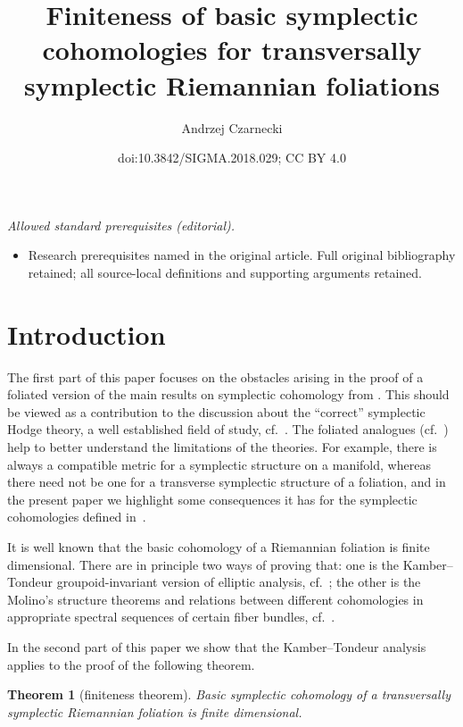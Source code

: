 \documentclass[10pt,a4paper]{amsart}
\title{Finiteness of basic symplectic cohomologies for transversally symplectic Riemannian foliations}
\author{Andrzej Czarnecki}
\date{doi:10.3842/SIGMA.2018.029; CC BY 4.0}
\numberwithin{equation}{section}
\newtheorem{Theorem}{Theorem}[section]
{ \theoremstyle{definition}
\newtheorem{Definition}[Theorem]{Definition}
\newtheorem{Example}[Theorem]{Example}
\newtheorem{Remark}[Theorem]{Remark} }
\begin{document}
\maketitle
\noindent\textit{Allowed standard prerequisites (editorial).}\begin{itemize}
\item Research prerequisites named in the original article. Full original bibliography retained; all source-local definitions and supporting arguments retained.
\end{itemize}\medskip
\section{Introduction}
The first part of this paper focuses on the obstacles arising in the proof of a foliated version of the main results on symplectic cohomology from \cite{tseng}. This should be viewed as a contribution to the discussion about the ``correct'' symplectic Hodge theory, a well established field of study, cf.~\cite{brylinski,cavalcanti,fernandezibanez,yau,yan}. The foliated analogues (cf.~\cite{baczekija,pawelija,he,pak}) help to better understand the limitations of the theories. For example, there is always a compatible metric for a symplectic structure on a manifold, whereas there need not be one for a transverse symplectic structure of a foliation, and in the present paper we highlight some consequences it has for the symplectic cohomologies defined in~\cite{tseng}.

It is well known that the basic cohomology of a Riemannian foliation is finite dimensional. There are in principle two ways of proving that: one is the Kamber--Tondeur groupoid-invariant version of elliptic analysis, cf.~\cite{azizeliptyczny}; the other is the Molino's structure theorems and relations between different cohomologies in appropriate spectral sequences of certain fiber bundles, cf.~\cite{aziztopologiczny}.

In the second part of this paper we show that the Kamber--Tondeur analysis applies to the proof of the following theorem.

\begin{Theorem}[finiteness theorem] \label{main} Basic symplectic cohomology of a transversally symplectic Riemannian foliation is finite dimensional.
\end{Theorem}
\end{document}
